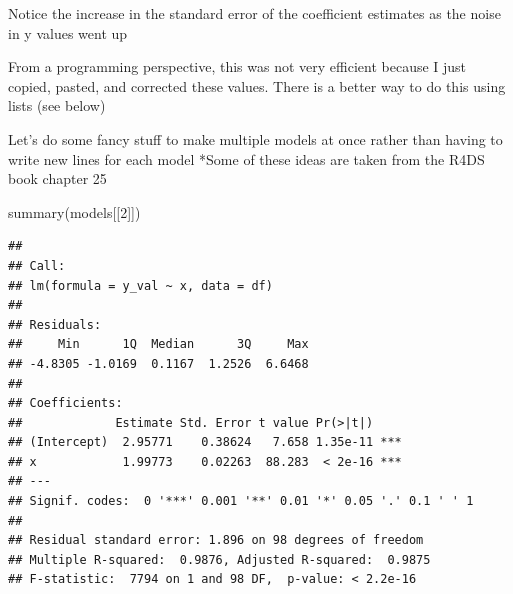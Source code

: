 \documentclass[
]{book}
\newenvironment{Shaded}{\begin{snugshade}}{\end{snugshade}}
\newcommand{\AttributeTok}[1]{\textcolor[rgb]{0.77,0.63,0.00}{#1}}
\newcommand{\ControlFlowTok}[1]{\textcolor[rgb]{0.13,0.29,0.53}{\textbf{#1}}}
\newcommand{\DecValTok}[1]{\textcolor[rgb]{0.00,0.00,0.81}{#1}}
\newcommand{\FunctionTok}[1]{\textcolor[rgb]{0.00,0.00,0.00}{#1}}
\newcommand{\NormalTok}[1]{#1}
\newcommand{\OtherTok}[1]{\textcolor[rgb]{0.56,0.35,0.01}{#1}}
\newcommand{\SpecialCharTok}[1]{\textcolor[rgb]{0.00,0.00,0.00}{#1}}
\begin{document}
Notice the increase in the standard error of the coefficient estimates as the noise in y values went up

From a programming perspective, this was not very efficient because I just copied, pasted, and corrected these values.
There is a better way to do this using lists (see below)

Let's do some fancy stuff to make multiple models at once rather than having to write new lines for each model
*Some of these ideas are taken from the R4DS book chapter 25

\begin{Shaded}
\end{Shaded}

\begin{Shaded}
\begin{Highlighting}[]
\FunctionTok{summary}\NormalTok{(models[[}\DecValTok{2}\NormalTok{]])}
\end{Highlighting}
\end{Shaded}

\begin{verbatim}
## 
## Call:
## lm(formula = y_val ~ x, data = df)
## 
## Residuals:
##     Min      1Q  Median      3Q     Max 
## -4.8305 -1.0169  0.1167  1.2526  6.6468 
## 
## Coefficients:
##             Estimate Std. Error t value Pr(>|t|)    
## (Intercept)  2.95771    0.38624   7.658 1.35e-11 ***
## x            1.99773    0.02263  88.283  < 2e-16 ***
## ---
## Signif. codes:  0 '***' 0.001 '**' 0.01 '*' 0.05 '.' 0.1 ' ' 1
## 
## Residual standard error: 1.896 on 98 degrees of freedom
## Multiple R-squared:  0.9876, Adjusted R-squared:  0.9875 
## F-statistic:  7794 on 1 and 98 DF,  p-value: < 2.2e-16
\end{verbatim}
\end{document}
